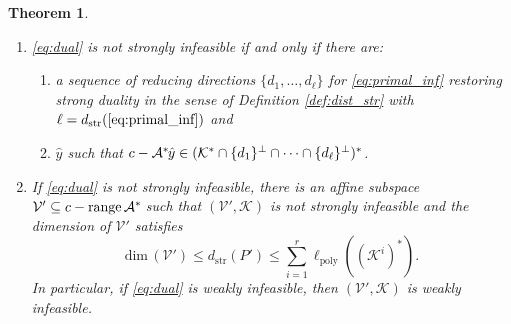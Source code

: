 \documentclass{article}
\newcommand{\stdMap}{ {\mathcal{A}}}
\newcommand{\stdCone}{ {\mathcal{K}}}
\newcommand{\stdAffine}{ \mathcal{V}}
\newcommand{\matRange}{{\mathrm{ range } \,}}
\newcommand{\distP}{\ell _{\text{poly}}}
\newcommand{\distS}{d _{\text{str}}}
\newcommand{\dimSpace}{{\mathrm{dim}} \,}
\newcommand{\T}{\ast\hspace{-1pt}}
\newtheorem{theorem}[definition]{Theorem}
\begin{document}
\begin{theorem}\label{theo:wi}
\hfill 
\begin{enumerate}[label=(\roman*)]
	\item  \eqref{eq:dual} is not strongly infeasible if and only if there are: 
\begin{enumerate}[label=({\alph*})]
\item a sequence of 
reducing directions $\{d_1, \ldots , d_\ell\}$ for \eqref{eq:primal_inf} restoring strong duality 
in the sense of Definition \ref{def:dist_str} with $\ell = \distS(\text{\ref{eq:primal_inf}})$ and
\item $\hat y$ such that $c - \stdMap^\T \hat y \in (\stdCone^*\cap \{d_1\}^\perp \cap \cdots \cap \{d_\ell\}^\perp)^*$.
\end{enumerate}
\item If \eqref{eq:dual} is not strongly infeasible, there is 
an affine subspace $\stdAffine ' \subseteq c - \matRange \stdMap^\T$ such that 
$(\stdAffine ', \stdCone)$ is not strongly infeasible and the dimension of $\stdAffine '$ satisfies 
\begin{equation*}
\dimSpace(\stdAffine ') \leq \distS(P') \leq \sum _{i=1}^{r} \distP((\stdCone ^i)^*).
\end{equation*}
In particular, if \eqref{eq:dual} is weakly infeasible, then $(\stdAffine ', \stdCone)$ is 
weakly infeasible.
\end{enumerate}
\end{theorem}
\end{document}
